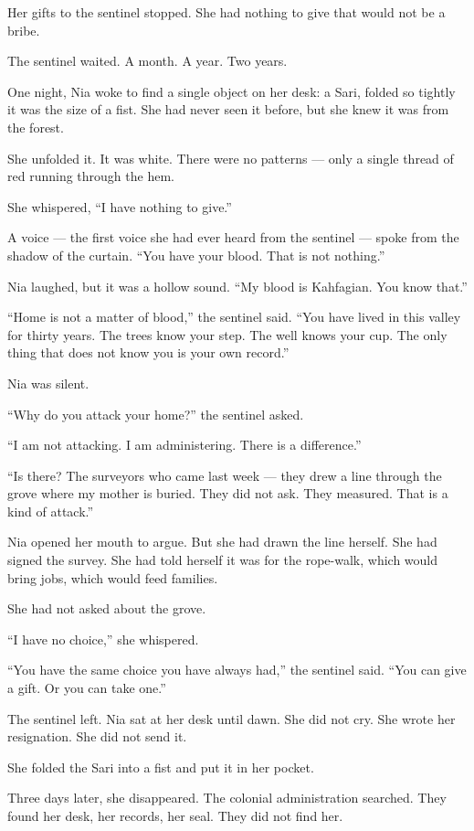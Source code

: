 \documentclass[10pt,twoside]{book}
\begin{document}
Her gifts to the sentinel stopped. She had nothing to give that would not be a bribe.

The sentinel waited. A month. A year. Two years.

One night, Nia woke to find a single object on her desk: a Sari, folded so tightly it was the size of a fist. She had never seen it before, but she knew it was from the forest.

She unfolded it. It was white. There were no patterns --- only a single thread of red running through the hem.

She whispered, ``I have nothing to give.''

A voice --- the first voice she had ever heard from the sentinel --- spoke from the shadow of the curtain. ``You have your blood. That is not nothing.''

Nia laughed, but it was a hollow sound. ``My blood is Kahfagian. You know that.''

``Home is not a matter of blood,'' the sentinel said. ``You have lived in this valley for thirty years. The trees know your step. The well knows your cup. The only thing that does not know you is your own record.''

Nia was silent.

``Why do you attack your home?'' the sentinel asked.

``I am not attacking. I am administering. There is a difference.''

``Is there? The surveyors who came last week --- they drew a line through the grove where my mother is buried. They did not ask. They measured. That is a kind of attack.''

Nia opened her mouth to argue. But she had drawn the line herself. She had signed the survey. She had told herself it was for the rope-walk, which would bring jobs, which would feed families.

She had not asked about the grove.

``I have no choice,'' she whispered.

``You have the same choice you have always had,'' the sentinel said. ``You can give a gift. Or you can take one.''

The sentinel left. Nia sat at her desk until dawn. She did not cry. She wrote her resignation. She did not send it.

She folded the Sari into a fist and put it in her pocket.

Three days later, she disappeared. The colonial administration searched. They found her desk, her records, her seal. They did not find her.
\end{document}
